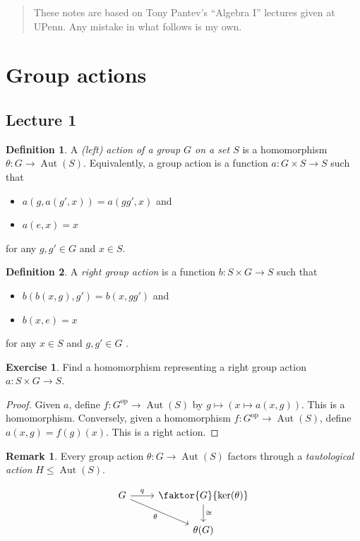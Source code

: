 \documentclass[10pt,letterpaper,cm]{nupset}
\theoremstyle{definition}
\newtheorem*{definition}{Definition}
\newtheorem{remark}{Remark}
\newtheorem{exercise}{Exercise}
\newcommand{\1}{\mathbf{1}}
\newcommand{\0}{\vec 0}
\DeclareMathOperator{\aut}{Aut}
\DeclareMathOperator{\op}{op}
\begin{document}
\begin{abstract}
These notes are based on Tony Pantev's ``Algebra I'' lectures given at UPenn. Any mistake in what follows is my own.
\end{abstract}

\tableofcontents
\newpage

\section{Group actions}

\subsection{Lecture 1}

\begin{definition} 
A \textit{(left) action of a group $G$ on a set $S$} is a homomorphism $\theta : G \to \aut(S)$. Equivalently, a group action is a function $a : G \times S \to S$ such that 
\begin{itemize}
\item $a(g, a(g', x)) = a(gg', x)$ and
\item $a(e, x) = x$
\end{itemize}
for any $g,g' \in G$ and $x\in S$. 
\end{definition}

\begin{definition}
A \textit{right group action} is a function $b: S \times G \to S$ such that 
\begin{itemize}
\item $b(b(x, g), g') = b(x, gg')$ and
\item $b(x, e) = x$
\end{itemize}
for any $x\in S$ and $g,g' \in G$ . 
\end{definition}

\theoremstyle{exercise}
\begin{exercise} Find a homomorphism representing a right group action $a: S \times G \to S$.
\end{exercise}
\begin{proof}
Given $a$, define $f: G^{\op} \to \aut(S)$ by $g \mapsto (x \mapsto a(x, g))$. This is a homomorphism. Conversely, given a homomorphism $f: G^{\op} \to \aut(S)$, define $a(x, g) = f(g)(x)$. This is a right action.
\end{proof}

\theoremstyle{remark}
\begin{remark}{Every group action $\theta: G \to \aut(S)$ factors through a \textit{tautological action} $H \leq \aut(S)$. }

\[ \begin{tikzcd}
G \arrow{r}{q} \arrow[swap]{dr} {\theta} & \faktor{G}{\ker(\theta)} \arrow{d}{\cong} \\%
 & \theta(G)
\end{tikzcd}
\]
\end{remark}
\end{document}
